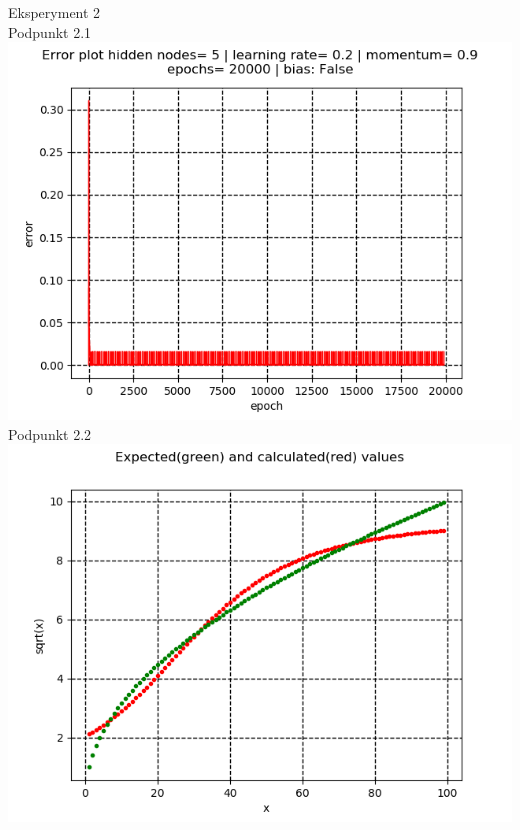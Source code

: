 \documentclass{classrep}
\begin{document}
{Eksperyment 2\\
Podpunkt 2.1\\
\includegraphics[scale=0.8]{imgs/2_1.png}\\
Podpunkt 2.2\\
\includegraphics[scale=0.8]{imgs/2_2.png}\\
}
\end{document}
